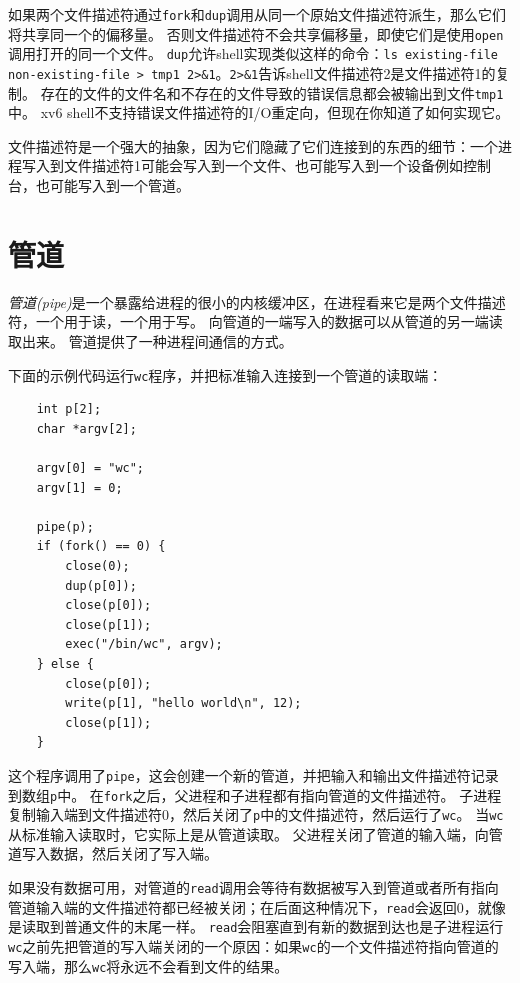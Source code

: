 如果两个文件描述符通过\texttt{fork}和\texttt{dup}调用从同一个原始文件描述符派生，那么它们将共享同一个的偏移量。
否则文件描述符不会共享偏移量，即使它们是使用\texttt{open}调用打开的同一个文件。
\texttt{dup}允许shell实现类似这样的命令：\texttt{ls existing-file non-existing-file > tmp1 2>\&1}。\texttt{2>\&1}告诉shell文件描述符2是文件描述符1的复制。
存在的文件的文件名和不存在的文件导致的错误信息都会被输出到文件\texttt{tmp1}中。
xv6 shell不支持错误文件描述符的I/O重定向，但现在你知道了如何实现它。

文件描述符是一个强大的抽象，因为它们隐藏了它们连接到的东西的细节：一个进程写入到文件描述符1可能会写入到一个文件、也可能写入到一个设备例如控制台，也可能写入到一个管道。

\section{管道}
\emph{管道(pipe)}是一个暴露给进程的很小的内核缓冲区，在进程看来它是两个文件描述符，一个用于读，一个用于写。
向管道的一端写入的数据可以从管道的另一端读取出来。
管道提供了一种进程间通信的方式。

下面的示例代码运行\texttt{wc}程序，并把标准输入连接到一个管道的读取端：
\begin{lstlisting}
    int p[2];
    char *argv[2];

    argv[0] = "wc";
    argv[1] = 0;

    pipe(p);
    if (fork() == 0) {
        close(0);
        dup(p[0]);
        close(p[0]);
        close(p[1]);
        exec("/bin/wc", argv);
    } else {
        close(p[0]);
        write(p[1], "hello world\n", 12);
        close(p[1]);
    }
\end{lstlisting}

这个程序调用了\texttt{pipe}，这会创建一个新的管道，并把输入和输出文件描述符记录到数组\texttt{p}中。
在\texttt{fork}之后，父进程和子进程都有指向管道的文件描述符。
子进程复制输入端到文件描述符0，然后关闭了\texttt{p}中的文件描述符，然后运行了\texttt{wc}。
当\texttt{wc}从标准输入读取时，它实际上是从管道读取。
父进程关闭了管道的输入端，向管道写入数据，然后关闭了写入端。

如果没有数据可用，对管道的\texttt{read}调用会等待有数据被写入到管道或者所有指向管道输入端的文件描述符都已经被关闭；在后面这种情况下，\texttt{read}会返回0，就像是读取到普通文件的末尾一样。
\texttt{read}会阻塞直到有新的数据到达也是子进程运行\texttt{wc}之前先把管道的写入端关闭的一个原因：如果\texttt{wc}的一个文件描述符指向管道的写入端，那么\texttt{wc}将永远不会看到文件的结果。

